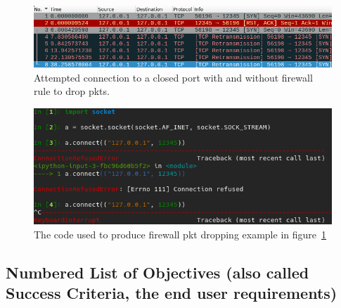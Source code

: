 \documentclass[titlepage]{article}
\let\Oldsubsection\subsection{}
\renewcommand{\subsection}{\FloatBarrier\Oldsubsection}
\begin{document}
\begin{figure}[H]
  \centering
  \includegraphics[width=\textwidth]{screenshots/packet_drop.png}
  \caption{%
    Attempted connection to a closed port with and without firewall rule to drop \glspl{pkt}.
  }\label{firewall}
\end{figure}

\begin{figure}[H]
  \centering
  \includegraphics[width=\textwidth]{screenshots/packet_drop_code.png}
  \caption{%
    The code used to produce firewall \gls{pkt} dropping example in figure~\ref{firewall}
  }\label{firewall_code}
\end{figure}

\subsection{Numbered List of Objectives (also called Success Criteria, the end user requirements)}
\end{document}

